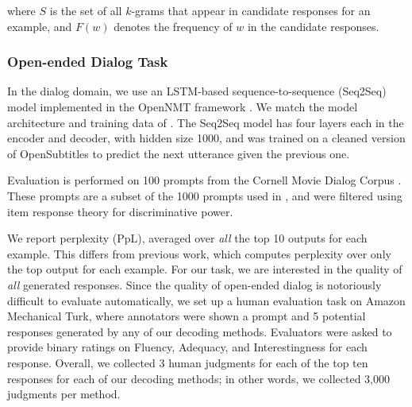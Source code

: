 \documentclass[thesis.tex]{subfiles}
\begin{document}
where $S$ is the set of all $k$-grams that appear in candidate responses for an example, and $F(w)$ denotes the frequency of $w$ in the candidate responses.

\subsubsection{Open-ended Dialog Task}

In the dialog domain, we use an LSTM-based sequence-to-sequence (Seq2Seq) model implemented in the OpenNMT framework \citep{opennmt2017klein}. We match the model architecture and training data of \cite{baheti2018generating}. The Seq2Seq model has four layers each in the encoder and decoder, with hidden size 1000, and was trained on a cleaned version of OpenSubtitles \citep{tiedemann2009news} to predict the next utterance given the previous one.

Evaluation is performed on 100 prompts from the Cornell Movie Dialog Corpus \citep{danescu2011chameleons}. These prompts are a subset of the 1000 prompts used in \cite{baheti2018generating}, and were filtered using item response theory for discriminative power.

We report perplexity (PpL), averaged over \textit{all} the top 10 outputs for each example. This differs from previous work, which computes perplexity over only the top output for each example. For our task, we are interested in the quality of \textit{all} generated responses. Since the quality of open-ended dialog is notoriously difficult to evaluate automatically, we set up a human evaluation task on Amazon Mechanical Turk, where annotators were shown a prompt and 5 potential responses generated by any of our decoding methods. Evaluators were asked to provide binary ratings on Fluency, Adequacy, and Interestingness for each response. Overall, we collected 3 human judgments for each of the top ten responses for each of our decoding methods; in other words, we collected 3,000 judgments per method.%
\end{document}
